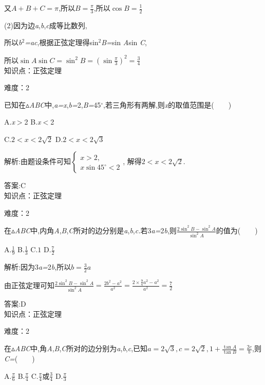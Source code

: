 \documentclass{article} %
\begin{document}
又$A+B+C=\pi$,所以$B=\frac{\pi}{3}$,所以$\cos B=\frac{1}{2}$

(2)因为边\textit{a},\textit{b},\textit{c}成等比数列,

所以\textit{b}${}^{2}$\textit{=ac},根据正弦定理得sin${}^{2}$\textit{B=}sin \textit{A}sin \textit{C},

所以$\sin A\sin C=\sin^2 B=(\sin \frac{\pi}{3})^2=\frac{3}{4}$ \\

知识点：正弦定理

难度：2


 已知在$\mathrm{\vartriangle}$\textit{ABC}中,\textit{a=x},\textit{b=}2,\textit{B=}45$\mathrm{{}^\circ}$,若三角形有两解,则\textit{x}的取值范围是(\textit{　　})

 A.\textit{x$>$}2 B.\textit{x$<$}2

 C.$2<x<2\sqrt{2}$ D.$2<x<2\sqrt{3}$

 解析:由题设条件可知$\left\{
\begin{array}{l}
x>2, \\
x\sin 45^{\circ} <2
\end{array}
\right.$, 解得$2<x<2\sqrt{2}$.

 答案:C \\

知识点：正弦定理

难度：2

 在$\mathrm{\vartriangle}$\textit{ABC}中,内角\textit{A},\textit{B},\textit{C}所对的边分别是\textit{a},\textit{b},\textit{c.}若3\textit{a=}2\textit{b},则$\frac{2\sin^2 B-\sin^2 A}{\sin^2 A}$的值为(\textit{　　})

 A.$\frac{1}{9}$ B.$\frac{1}{3}$ C.$1$ D.$\frac{7}{2}$

 解析:因为3\textit{a=}2\textit{b},所以$b=\frac{3}{2}a$

由正弦定理可知$\frac{2\sin^2 B-\sin^2 A}{\sin^2 A}=\frac{2b^2-a^2}{a^2}=\frac{2\times \frac{9}{4}a^2-a^2}{a^2}=\frac{7}{2}$

 答案:D \\

知识点：正弦定理

难度：2

 在$\mathrm{\vartriangle}$\textit{ABC}中,角\textit{A},\textit{B},\textit{C}所对的边分别为\textit{a},\textit{b},\textit{c},已知$a=2\sqrt{3},c=2\sqrt{2},1+\frac{\tan A}{\tan B}=\frac{2c}{b}$,则\textit{C=}(\textit{　　})

 A.$\frac{\pi}{6}$ B.$\frac{\pi}{4}$ C.$\frac{\pi}{4}$或$\frac{3}{4}$ D.$\frac{\pi}{3}$
\end{document}
